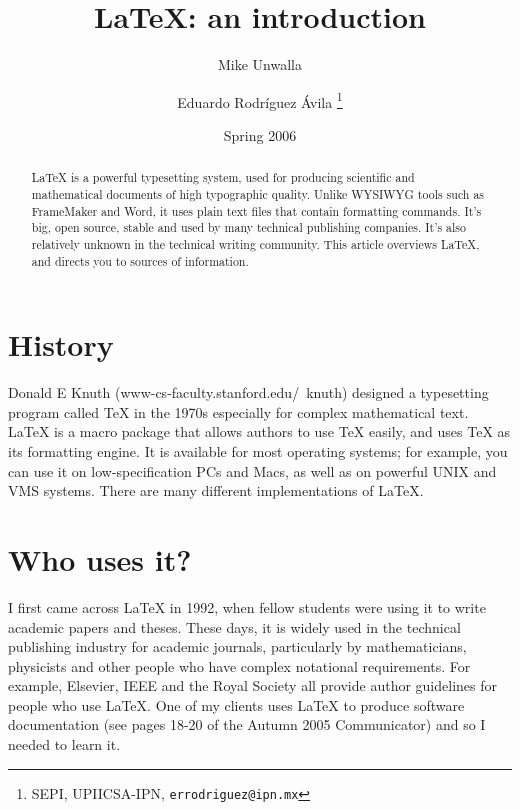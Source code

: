 \documentclass{article}
\title{LaTeX: an introduction}
\author{Mike Unwalla \and Eduardo Rodríguez Ávila \thanks{SEPI, UPIICSA-IPN,  \texttt{errodriguez@ipn.mx} }}
\date{Spring 2006}
\begin{document}
	\maketitle
	\begin{abstract}
	LaTeX is a powerful typesetting system, used for 
	producing scientific and mathematical 
	documents of high typographic quality. Unlike
	WYSIWYG tools such as FrameMaker and Word,
	it uses plain text files that contain formatting
	commands. It's big, open source, stable and used
	by many technical publishing companies. It's
	also relatively unknown in the technical writing
	community. This article overviews LaTeX, and
	directs you to sources of information.
	\end{abstract}
	
	\section{History}
	
	Donald E Knuth (www-cs-faculty.stanford.edu/~knuth) 
	designed a typesetting program
	called TeX in the 1970s especially for complex
	mathematical text. LaTeX is a macro package
	that allows authors to use TeX easily, and uses
	TeX as its formatting engine. It is available for
	most operating systems; for example, you can
	use it on low-specification PCs and Macs, as well
	as on powerful UNIX and VMS systems. There
	are many different implementations of LaTeX.
	
	\section{Who uses it?}
	
	I first came across LaTeX in 1992, when fellow
	students were using it to write academic papers
	and theses. These days, it is widely used in
	the technical publishing industry for academic
	journals, particularly by mathematicians,
	physicists and other people who have complex
	notational requirements. For example, Elsevier,
	IEEE and the Royal Society all provide author
	guidelines for people who use LaTeX. One of
	my clients uses LaTeX to produce software
	documentation (see pages 18-20 of the Autumn
	2005 Communicator) and so I needed to learn it.
\end{document}
